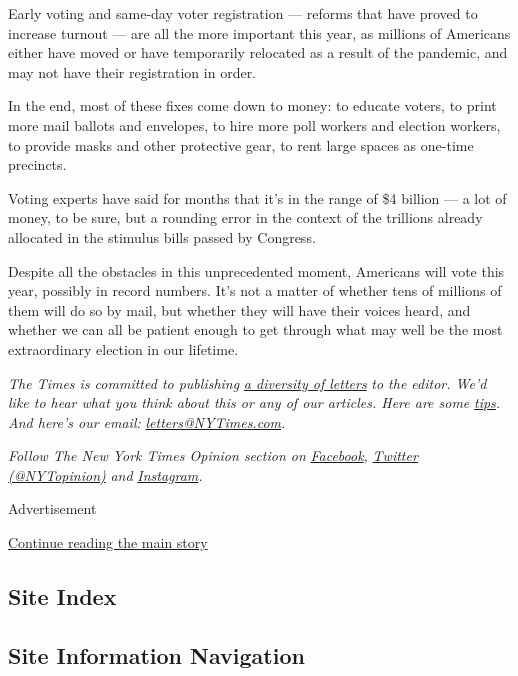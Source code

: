 Early voting and same-day voter registration --- reforms that have
proved to increase turnout --- are all the more important this year, as
millions of Americans either have moved or have temporarily relocated as
a result of the pandemic, and may not have their registration in order.

In the end, most of these fixes come down to money: to educate voters,
to print more mail ballots and envelopes, to hire more poll workers and
election workers, to provide masks and other protective gear, to rent
large spaces as one-time precincts.

Voting experts have said for months that it's in the range of \$4
billion --- a lot of money, to be sure, but a rounding error in the
context of the trillions already allocated in the stimulus bills passed
by Congress.

Despite all the obstacles in this unprecedented moment, Americans will
vote this year, possibly in record numbers. It's not a matter of whether
tens of millions of them will do so by mail, but whether they will have
their voices heard, and whether we can all be patient enough to get
through what may well be the most extraordinary election in our
lifetime.

\emph{The Times is committed to publishing}
\href{https://www.nytimes3xbfgragh.onion/2019/01/31/opinion/letters/letters-to-editor-new-york-times-women.html}{\emph{a
diversity of letters}} \emph{to the editor. We'd like to hear what you
think about this or any of our articles. Here are some}
\href{https://help.nytimes3xbfgragh.onion/hc/en-us/articles/115014925288-How-to-submit-a-letter-to-the-editor}{\emph{tips}}\emph{.
And here's our email:}
\href{mailto:letters@NYTimes.com}{\emph{letters@NYTimes.com}}\emph{.}

\emph{Follow The New York Times Opinion section on}
\href{https://www.facebookcorewwwi.onion/nytopinion}{\emph{Facebook}}\emph{,}
\href{http://twitter.com/NYTOpinion}{\emph{Twitter (@NYTopinion)}}
\emph{and}
\href{https://www.instagram.com/nytopinion/}{\emph{Instagram}}\emph{.}

Advertisement

\protect\hyperlink{after-bottom}{Continue reading the main story}

\hypertarget{site-index}{%
\subsection{Site Index}\label{site-index}}

\hypertarget{site-information-navigation}{%
\subsection{Site Information
Navigation}\label{site-information-navigation}}


